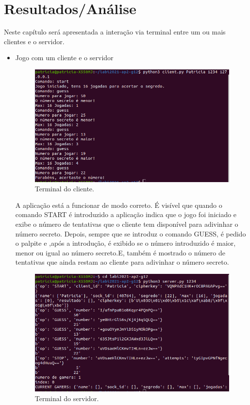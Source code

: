 \documentclass{report}
\begin{document}
\chapter{Resultados/Análise}
\label{chap.resultados/análise}
Neste capítulo será apresentada a interação via terminal entre um ou mais clientes e o servidor.
\begin{itemize}
\item Jogo com um cliente e o servidor 
\begin{figure}[H]
        \centering
        \includegraphics[scale=0.50]{guessNormal}      
        \caption{Terminal do cliente.}
\end{figure}

A aplicação está a funcionar de modo correto. É visível que quando o comando START é introduzido a aplicação indica que o jogo foi iniciado e exibe o número de tentativas que o cliente tem disponível para adivinhar o número secreto.
Depois, sempre que se introduz o comando GUESS, é pedido o palpite e ,após a introdução, é exibido se o número introduzido é maior, menor ou igual ao número secreto.E, também é mostrado o número de tentativas que ainda restam ao cliente para adivinhar o número secreto.

\begin{figure}[H]
        \centering
        \includegraphics[scale=0.50]{guessNormal1}      
        \caption{Terminal do servidor.}
\end{figure}


\end{itemize}
\end{document}
